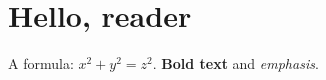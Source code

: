 \documentclass{article}
\begin{document}
\section{Hello, reader}
A formula: $x^2 + y^2 = z^2$.
\textbf{Bold text} and \emph{emphasis}.
\end{document}
